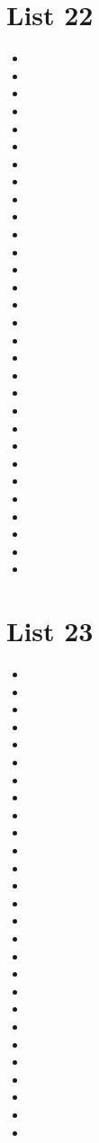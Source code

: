 \documentclass[a4paper,10pt]{article}
\begin{document}
\begin{CJK*}{UTF8}{gkai}
\section{List 22}
\begin{itemize}
\item 
\item 
\item 
\item 
\item 
\item 
\item 
\item 
\item 
\item 
\item 
\item 
\item 
\item 
\item 
\item 
\item 
\item 
\item 
\item 
\item 
\item 
\item 
\item 
\item 
\item 
\item 
\item 
\item 
\item 
\end{itemize}

\newpage
\section{List 23}
\begin{itemize}
\item 
\item 
\item 
\item 
\item 
\item 
\item 
\item 
\item 
\item 
\item 
\item 
\item 
\item 
\item 
\item 
\item 
\item 
\item 
\item 
\item 
\item 
\item 
\item 
\item 
\item 
\item 
\end{itemize}


\end{CJK*}
\end{document}
